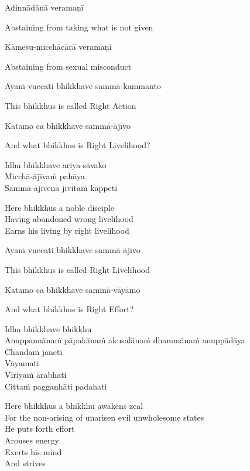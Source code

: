 Adinnādānā veramaṇī

\begin{english}
  Abstaining from taking what is not given
\end{english}

Kāmesu-micchācārā veramaṇī

\begin{english}
  Abstaining from sexual misconduct
\end{english}

Ayaṁ vuccati bhikkhave sammā-kammanto

\begin{english}
  This bhikkhus is called Right Action
\end{english}

Katamo ca bhikkhave sammā-ājīvo

\begin{english}
  And what bhikkhus is Right Livelihood?
\end{english}

Idha bhikkhave ariya-sāvako\\
Micchā-ājīvaṁ pahāya\\
Sammā-ājīvena jīvitaṁ kappeti

\begin{english}
  Here bhikkhus a noble disciple\\
  Having abandoned wrong livelihood\\
  Earns his living by right livelihood
\end{english}

Ayaṁ vuccati bhikkhave sammā-ājīvo

\begin{english}
  This bhikkhus is called Right Livelihood
\end{english}

Katamo ca bhikkhave sammā-vāyāmo

\begin{english}
  And what bhikkhus is Right Effort?
\end{english}

Idha bhikkhave bhikkhu\\
Anuppannānaṁ pāpakānaṁ akusalānaṁ dhammānaṁ anuppādāya\\
Chandaṁ janeti\\
Vāyamati\\
Vīriyaṁ ārabhati\\
Cittaṁ paggaṇhāti padahati

\begin{english}
  Here bhikkhus a bhikkhu awakens zeal\\
  For the non-arising of unarisen evil unwholesome states\\
  He puts forth effort\\
  Arouses energy\\
  Exerts his mind\\
  And strives
\end{english}

